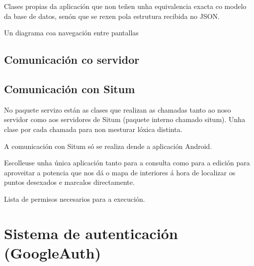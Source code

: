 Clases propias da aplicación que non teñen unha equivalencia exacta co modelo da base de datos, senón que se rexen pola estrutura recibida no JSON.



Un diagrama coa navegación entre pantallas


\subsection{Comunicación co servidor}

\subsection{Comunicación con Situm}
No paquete servizo están as clases que realizan as chamadas tanto ao noso servidor como aos servidores de Situm (paquete interno chamado situm). Unha clase por cada chamada para non mesturar lóxica distinta.

A comunicación con Situm só se realiza dende a aplicación Android.

Escolleuse unha única aplicación tanto para a consulta como para a edición para aproveitar a potencia que nos dá o mapa de interiores á hora de localizar os puntos desexados e marcalos directamente.


Lista de permisos necesarios para a execución.


\section{Sistema de autenticación (GoogleAuth)}
